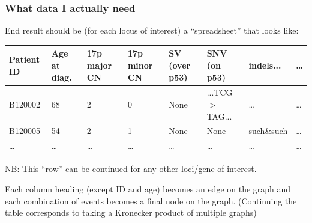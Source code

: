 \documentclass{beamer}
\begin{document}
\begin{frame}
    \frametitle{What data I actually need}
    End result should be (for each locus of interest) a ``spreadsheet'' that looks
    like:

    \begin{center}
    \tiny{
    \begin{tabular}{| l | l | l | l | l | l | l | l |}
    \hline
    Patient ID & Age at diag. & 17p major CN & 17p minor CN & SV (over p53) &
    SNV (on p53) & indels... & \dots \\
    \hline
    B120002 & 68 & 2 & 0 & None & ...TCG$>$TAG... & \dots & \dots \\
    \hline
    B120005 & 54 & 2 & 1 & None & None & such\&such & \dots \\
    \hline
    \dots & \dots & \dots & \dots & \dots & \dots & \dots & \dots \\
    \hline
    \end{tabular}

    }
    \end{center}

    NB: This ``row'' can be continued for any other loci/gene of interest.

    \;
    
    Each column heading (except ID and age) becomes an edge on the graph and
    each combination of events becomes a final node on the graph. (Continuing the
    table corresponds to taking a Kronecker product of multiple graphs)
\end{frame}
\end{document}
